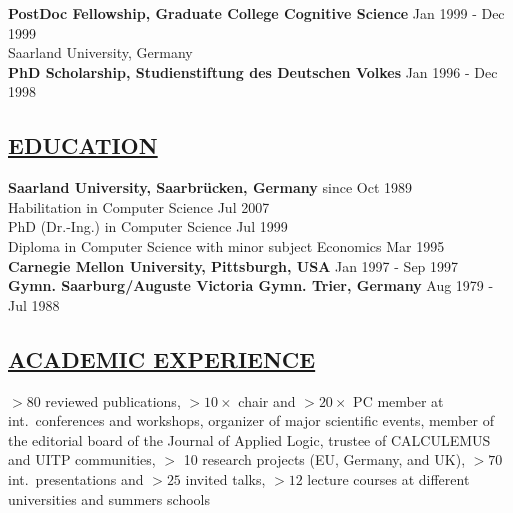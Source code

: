 \documentclass[10pt]{article}
\begin{document}
\noindent
\textbf{PostDoc Fellowship, Graduate College Cognitive Science}  \hfill Jan 1999 - Dec 1999\\
Saarland University, Germany\\[-.5em]

\noindent  
\textbf{PhD Scholarship, Studienstiftung des Deutschen Volkes} \hfill Jan 1996 - Dec 1998


\subsection*{\underline{EDUCATION}}
\noindent
\textbf{Saarland University, Saarbr\"ucken, Germany} \hfill since Oct 1989 \\
Habilitation in Computer Science \hfill Jul 2007\\
PhD (Dr.-Ing.) in Computer Science \hfill Jul 1999\\
Diploma in Computer Science with minor subject Economics \hfill Mar 1995\\[-.5em]

\noindent
\textbf{Carnegie Mellon University, Pittsburgh, USA}   \hfill  Jan 1997 - Sep 1997\\[-.5em]

\noindent
\textbf{Gymn. Saarburg/Auguste Victoria Gymn. Trier, Germany} \hfill Aug 1979 - Jul 1988


\subsection*{\underline{ACADEMIC EXPERIENCE}}
\noindent
$>80$ reviewed publications, $>10\times$ chair and $>20\times$ PC member at int.~conferences and workshops, organizer of major scientific events, member of the editorial board of the Journal of Applied Logic, trustee of CALCULEMUS and UITP
communities, $>$ 10 research projects (EU, Germany, and UK), $> 70$ int.~presentations and $>25$ invited talks, $>12$ lecture courses at different universities and summers schools



\end{document}
